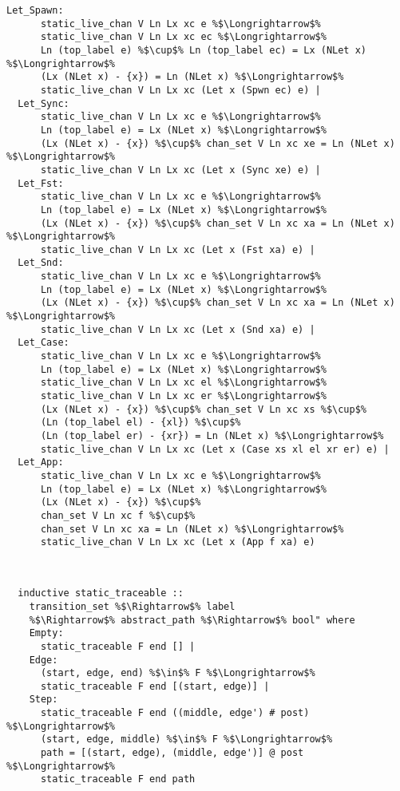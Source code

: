 \begin{lstlisting}[style=codestyle1, escapechar=\%]
  Let_Spawn:
      static_live_chan V Ln Lx xc e %$\Longrightarrow$%
      static_live_chan V Ln Lx xc ec %$\Longrightarrow$%
      Ln (top_label e) %$\cup$% Ln (top_label ec) = Lx (NLet x) %$\Longrightarrow$%
      (Lx (NLet x) - {x}) = Ln (NLet x) %$\Longrightarrow$%
      static_live_chan V Ln Lx xc (Let x (Spwn ec) e) |
  Let_Sync:
      static_live_chan V Ln Lx xc e %$\Longrightarrow$%
      Ln (top_label e) = Lx (NLet x) %$\Longrightarrow$%
      (Lx (NLet x) - {x}) %$\cup$% chan_set V Ln xc xe = Ln (NLet x) %$\Longrightarrow$%
      static_live_chan V Ln Lx xc (Let x (Sync xe) e) |
  Let_Fst:
      static_live_chan V Ln Lx xc e %$\Longrightarrow$%
      Ln (top_label e) = Lx (NLet x) %$\Longrightarrow$%
      (Lx (NLet x) - {x}) %$\cup$% chan_set V Ln xc xa = Ln (NLet x) %$\Longrightarrow$%
      static_live_chan V Ln Lx xc (Let x (Fst xa) e) |
  Let_Snd:
      static_live_chan V Ln Lx xc e %$\Longrightarrow$%
      Ln (top_label e) = Lx (NLet x) %$\Longrightarrow$%
      (Lx (NLet x) - {x}) %$\cup$% chan_set V Ln xc xa = Ln (NLet x) %$\Longrightarrow$%
      static_live_chan V Ln Lx xc (Let x (Snd xa) e) |
  Let_Case:
      static_live_chan V Ln Lx xc e %$\Longrightarrow$%
      Ln (top_label e) = Lx (NLet x) %$\Longrightarrow$%
      static_live_chan V Ln Lx xc el %$\Longrightarrow$%
      static_live_chan V Ln Lx xc er %$\Longrightarrow$%
      (Lx (NLet x) - {x}) %$\cup$% chan_set V Ln xc xs %$\cup$% 
      (Ln (top_label el) - {xl}) %$\cup$%
      (Ln (top_label er) - {xr}) = Ln (NLet x) %$\Longrightarrow$%
      static_live_chan V Ln Lx xc (Let x (Case xs xl el xr er) e) |
  Let_App:
      static_live_chan V Ln Lx xc e %$\Longrightarrow$%
      Ln (top_label e) = Lx (NLet x) %$\Longrightarrow$%
      (Lx (NLet x) - {x}) %$\cup$%
      chan_set V Ln xc f %$\cup$%
      chan_set V Ln xc xa = Ln (NLet x) %$\Longrightarrow$%
      static_live_chan V Ln Lx xc (Let x (App f xa) e)


  \end{lstlisting}


\begin{lstlisting}[style=codestyle1, escapechar=\%]

  inductive static_traceable ::
    transition_set %$\Rightarrow$% label
    %$\Rightarrow$% abstract_path %$\Rightarrow$% bool" where
    Empty:
      static_traceable F end [] |
    Edge:
      (start, edge, end) %$\in$% F %$\Longrightarrow$%
      static_traceable F end [(start, edge)] |
    Step:
      static_traceable F end ((middle, edge') # post) %$\Longrightarrow$%
      (start, edge, middle) %$\in$% F %$\Longrightarrow$%
      path = [(start, edge), (middle, edge')] @ post %$\Longrightarrow$%
      static_traceable F end path

  \end{lstlisting}



